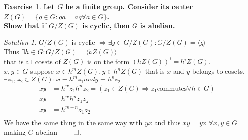 \documentclass[a4paper,twoside=false,abstract=false,numbers=noenddot,
titlepage=false,headings=small,parskip=half,version=last]{scrartcl}
\theoremstyle{definition}
\newtheorem{exercise}{Exercise}
\theoremstyle{remark}
\newtheorem*{solution}{Solution}
\begin{document}
\begin{exercise}
{\bf
Let $G$ be a  finite group. Consider its center $Z(G) = \{ g \in G : ga=ag \forall a\in G\}$.\\
Show that if $G/Z(G)$ is cyclic, then $G$ is abelian.
}
\end{exercise}
\begin{solution}
$G/Z(G)$ is cyclic $\Rightarrow \exists g \in G/Z(G) : G/Z(G) = \langle g
\rangle$\\
Thus $\exists h \in G : G/Z(G) = \langle hZ(G) \rangle$\\
that is all cosets of $Z(G)$ is on the form $(hZ(G))^i=h^iZ(G)$. \\
$x,y \in G$ suppose $x \in h^mZ(G),y \in h^nZ(G)$ that is $x$ and $y$ belongs
to cosets. $\exists z_1,z_2 \in Z(G) : x=h^mz_1 and y=h^nz_2 $\\
\begin{align*}
    xy &= h^mz_1h^nz_2 = (z_1\in Z(G) \Rightarrow z_1 \mbox{commutes} \forall h
    \in G)\\
    xy &= h^mh^nz_1z_2 \\
    xy &= h^{m+n}z_1z_2 \\
\end{align*}
We have the same thing in the same way with $yx$ and thus $xy=yx$ $\forall x,y
\in G$ making $G$ abelian $\qed$.

\end{solution}


\end{document}
